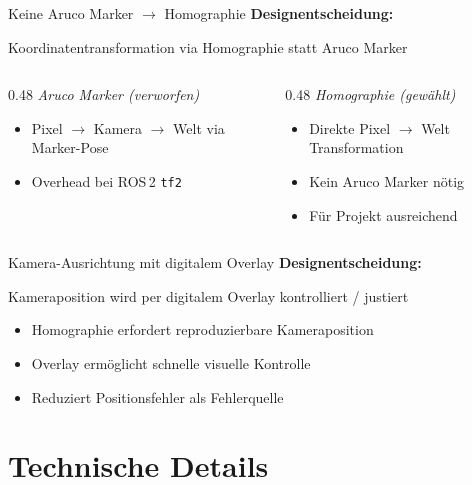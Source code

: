\documentclass[aspectratio=169]{beamer}
\begin{document}
	\begin{frame}{Keine Aruco Marker $\rightarrow$ Homographie }
	\textbf{Designentscheidung:} 
	
	Koordinatentransformation via Homographie statt Aruco Marker
		
	\vspace{1em}
	\begin{columns}[T]
	\begin{column}{0.48\textwidth}
	    \textit{Aruco Marker (verworfen)}
	    \begin{itemize}
			\item Pixel $\to$ Kamera $\to$ Welt via Marker-Pose
			\item Overhead bei ROS\,2 \texttt{tf2}
	    \end{itemize}
	\end{column}
	\begin{column}{0.48\textwidth}
	    \textit{Homographie (gewählt)}
	    \begin{itemize}
	        \item Direkte Pixel $\to$ Welt Transformation
	        \item Kein Aruco Marker nötig
	        \item Für Projekt ausreichend 
	    \end{itemize}
	\end{column}
	\end{columns}
	\end{frame}
	
	
	\begin{frame}{Kamera-Ausrichtung mit digitalem Overlay}
	\textbf{Designentscheidung:} 
	
	Kameraposition wird per digitalem Overlay kontrolliert / justiert
	
	\vspace{1em}
	\begin{itemize}
	    \item Homographie erfordert reproduzierbare Kameraposition
	    \item Overlay ermöglicht schnelle visuelle Kontrolle
	    \item Reduziert Positionsfehler als Fehlerquelle
	\end{itemize}
	\end{frame}
	
	\section{Technische Details}										%
\end{document}

